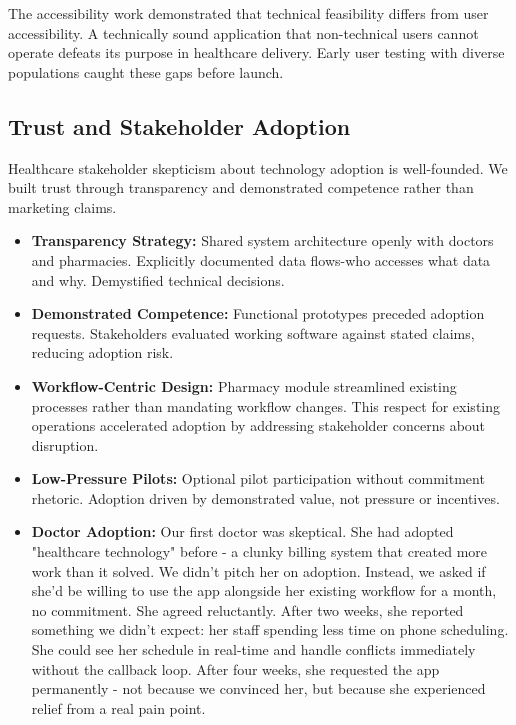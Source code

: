 \documentclass[12pt,a4paper]{report}
\begin{document}
The accessibility work demonstrated that technical feasibility differs from user accessibility. A technically sound application that non-technical users cannot operate defeats its purpose in healthcare delivery. Early user testing with diverse populations caught these gaps before launch.

\subsection{Trust and Stakeholder Adoption}

Healthcare stakeholder skepticism about technology adoption is well-founded. We built trust through transparency and demonstrated competence rather than marketing claims.

\begin{itemize}
  \item \textbf{Transparency Strategy:} Shared system architecture openly with doctors and pharmacies. Explicitly documented data flows-who accesses what data and why. Demystified technical decisions.

  \item \textbf{Demonstrated Competence:} Functional prototypes preceded adoption requests. Stakeholders evaluated working software against stated claims, reducing adoption risk.

  \item \textbf{Workflow-Centric Design:} Pharmacy module streamlined existing processes rather than mandating workflow changes. This respect for existing operations accelerated adoption by addressing stakeholder concerns about disruption.

  \item \textbf{Low-Pressure Pilots:} Optional pilot participation without commitment rhetoric. Adoption driven by demonstrated value, not pressure or incentives.

  \item \textbf{Doctor Adoption:} Our first doctor was skeptical. She had adopted "healthcare technology" before - a clunky billing system that created more work than it solved. We didn't pitch her on adoption. Instead, we asked if she'd be willing to use the app alongside her existing workflow for a month, no commitment. She agreed reluctantly. After two weeks, she reported something we didn't expect: her staff spending less time on phone scheduling. She could see her schedule in real-time and handle conflicts immediately without the callback loop. After four weeks, she requested the app permanently - not because we convinced her, but because she experienced relief from a real pain point.


\end{itemize}
\end{document}
